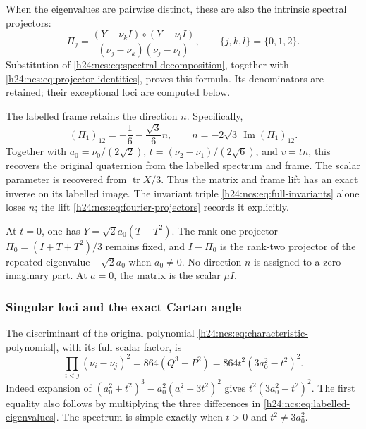 When the eigenvalues are pairwise distinct, these are also the
intrinsic spectral projectors:
\begin{equation}
 \Pi_j=
 \frac{(Y-\nu_kI)\circ(Y-\nu_lI)}
      {(\nu_j-\nu_k)(\nu_j-\nu_l)},
 \qquad\{j,k,l\}=\{0,1,2\}.
 \label{h24:ncs:eq:intrinsic-projectors}\tag{NCS14}
\end{equation}
Substitution of \eqref{h24:ncs:eq:spectral-decomposition}, together
with \eqref{h24:ncs:eq:projector-identities}, proves this formula.
Its denominators are retained; their exceptional loci are
computed below.

The labelled frame retains the direction $n$. Specifically,
\begin{equation}
 (\Pi_1)_{12}=-\frac16-\frac{\sqrt3}{6}n,
 \qquad n=-2\sqrt3\,\operatorname{Im}(\Pi_1)_{12}.
 \label{h24:ncs:eq:directional-inverse}\tag{NCS15}
\end{equation}
Together with
$a_0=\nu_0/(2\sqrt2)$,
$t=(\nu_2-\nu_1)/(2\sqrt6)$, and $v=tn$, this recovers the
original quaternion from the labelled spectrum and frame. The
scalar parameter is recovered from $\operatorname{tr}X/3$.
Thus the matrix and frame lift has an exact inverse on its
labelled image. The invariant triple
\eqref{h24:ncs:eq:full-invariants} alone loses $n$; the lift
\eqref{h24:ncs:eq:fourier-projectors} records it explicitly.

At $t=0$, one has $Y=\sqrt2a_0(T+T^2)$.
The rank-one projector $\Pi_0=(I+T+T^2)/3$ remains fixed, and
$I-\Pi_0$ is the rank-two projector of the repeated eigenvalue
$-\sqrt2a_0$ when $a_0\ne0$. No direction $n$ is assigned to a
zero imaginary part. At $a=0$, the matrix is the scalar $\mu I$.

\subsubsection{Singular loci and the exact Cartan angle}
\label{h24:ncs:sec:singular-angle}

The discriminant of the original polynomial
\eqref{h24:ncs:eq:characteristic-polynomial}, with its full scalar
factor, is
\begin{equation}
 \boxed{
 \prod_{i<j}(\nu_i-\nu_j)^2
       =864(Q^3-P^2)
       =864t^2(3a_0^2-t^2)^2.
 }
 \label{h24:ncs:eq:discriminant}\tag{NCS16}
\end{equation}
Indeed expansion of
$(a_0^2+t^2)^3-a_0^2(a_0^2-3t^2)^2$ gives
$t^2(3a_0^2-t^2)^2$. The first equality also follows by
multiplying the three differences in
\eqref{h24:ncs:eq:labelled-eigenvalues}. The spectrum is simple
exactly when $t>0$ and $t^2\ne3a_0^2$.

